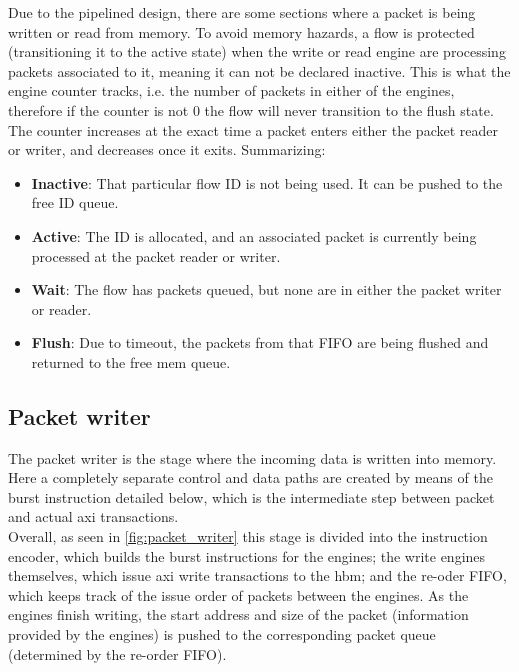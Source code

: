 Due to the pipelined design, there are some sections where a packet is being written or read from memory. To avoid memory hazards, 
a flow is protected (transitioning it to the active state) when the write or read engine are processing packets associated to it, 
meaning it can not be declared inactive. This is what the engine counter tracks, i.e. the number of packets in either of the 
engines, therefore if the counter is not 0 the flow will never transition to the flush state. The counter increases at the exact 
time a packet enters either the packet reader or writer, and decreases once it exits. Summarizing: \\

\begin{itemize}
  \item \textbf{Inactive}: That particular flow ID is not being used. It can be pushed to the free ID queue.
  \item \textbf{Active}: The ID is allocated, and an associated packet is currently being processed at the packet reader or writer.
  \item \textbf{Wait}: The flow has packets queued, but none are in either the packet writer or reader.
  \item \textbf{Flush}: Due to timeout, the packets from that FIFO are being flushed and returned to the free mem queue.
\end{itemize}

\subsection{Packet writer}

The packet writer is the stage where the incoming data is written into memory. Here a completely separate control and data paths are created 
by means of the burst instruction detailed below, which is the intermediate step between packet and actual \gls{axi} transactions. \\

Overall, as seen in \ref{fig:packet_writer} this stage is divided into the instruction encoder, which builds the burst instructions for the engines; 
the write engines themselves, which issue \gls{axi} write transactions to the \gls{hbm}; and the re-oder FIFO, which keeps track of the issue order of 
packets between the engines. As the engines finish writing, the start address and size of the packet (information provided by the engines) is pushed to the corresponding 
packet queue (determined by the re-order FIFO).\\

